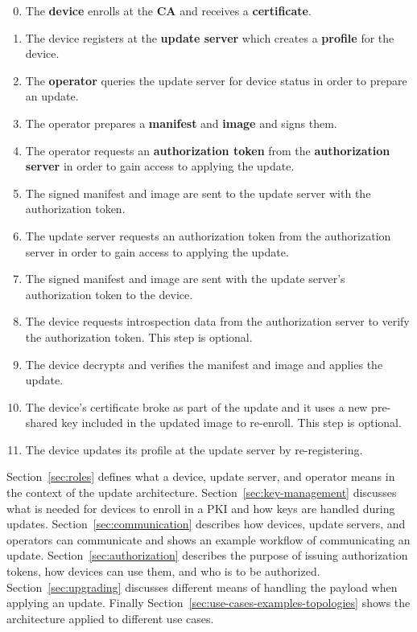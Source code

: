 \documentclass[0-thesis.tex]{subfiles}
\begin{document}
\begin{enumerate}
    \setcounter{enumi}{-1}
    \item The \textbf{device} enrolls at the \textbf{CA} and receives a
            \textbf{certificate}.
    \item The device registers at the \textbf{update server} which creates a \textbf{profile}
            for the device.
    \item The \textbf{operator} queries the update server for device status in order to
            prepare an update.
    \item The operator prepares a \textbf{manifest} and \textbf{image} and signs them.
    \item The operator requests an \textbf{authorization token} from the
            \textbf{authorization server} in order to gain access to applying the update.
    \item The signed manifest and image are sent to the update server with the
            authorization token.
    \item The update server requests an authorization token from the authorization server
            in order to gain access to applying the update.
    \item The signed manifest and image are sent with the update server's authorization
            token to the device.
    \item The device requests introspection data from the authorization server to verify
            the authorization token. This step is optional.
    \item The device decrypts and verifies the manifest and image and applies the update.
    \item The device's certificate broke as part of the update and it uses a new
            pre-shared key included in the updated image to re-enroll. This step is
            optional.
    \item The device updates its profile at the update server by re-registering.
\end{enumerate}

Section~\ref{sec:roles} defines what a device, update server, and operator means in the
context of the update architecture. Section~\ref{sec:key-management} discusses what is
needed for devices to enroll in a PKI and how keys are handled during updates.
Section~\ref{sec:communication} describes how devices, update servers, and operators can
communicate and shows an example workflow of communicating an update.
Section~\ref{sec:authorization} describes the purpose of issuing authorization tokens, how
devices can use them, and who is to be authorized. Section~\ref{sec:upgrading} discusses
different means of handling the payload when applying an update. Finally
Section~\ref{sec:use-cases-examples-topologies} shows the architecture applied to
different use cases.
\end{document}
